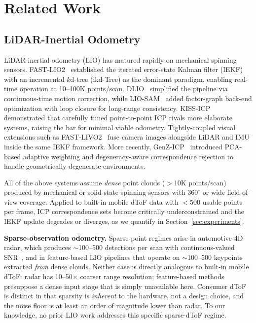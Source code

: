 \section{Related Work}
\label{sec:related}

\subsection{LiDAR-Inertial Odometry}

LiDAR-inertial odometry (LIO) has matured rapidly on mechanical spinning
sensors.  FAST-LIO2~\cite{xu2022fastlio2} established the iterated
error-state Kalman filter (IEKF) with an incremental $k$d-tree (ikd-Tree)
as the dominant paradigm, enabling real-time operation at 10--100K
points/scan.  DLIO~\cite{chen2023dlio} simplified the pipeline via
continuous-time motion correction, while LIO-SAM~\cite{shan2020liosam}
added factor-graph back-end optimization with loop closure for long-range
consistency.  KISS-ICP~\cite{vizzo2023kiss} demonstrated that
carefully tuned point-to-point ICP rivals more elaborate systems, raising
the bar for minimal viable odometry.  Tightly-coupled visual extensions
such as FAST-LIVO2~\cite{zheng2024fastlivo2} fuse camera images alongside
LiDAR and IMU inside the same IEKF framework.  More recently,
GenZ-ICP~\cite{lee2025genz} introduced PCA-based adaptive weighting and
degeneracy-aware correspondence rejection to handle geometrically
degenerate environments.

All of the above systems assume \emph{dense} point clouds ($>$10K
points/scan) produced by mechanical or solid-state spinning sensors with
$360^{\circ}$ or wide field-of-view coverage.  Applied to built-in mobile
dToF data with $<$500 usable points per frame, ICP correspondence sets
become critically underconstrained and the IEKF update degrades or
diverges, as we quantify in Section~\ref{sec:experiments}.

\textbf{Sparse-observation odometry.}  Sparse point regimes arise in
automotive 4D radar, which produces ${\sim}$100--500 detections per scan
with continuous-valued SNR~\cite{zhang2023radar}, and in feature-based LIO
pipelines that operate on ${\sim}$100--500 keypoints extracted \emph{from}
dense clouds.  Neither case is directly analogous to built-in mobile dToF:
radar has 10--50$\times$ coarser range resolution; feature-based methods
presuppose a dense input stage that is simply unavailable here.  Consumer
dToF is distinct in that sparsity is \emph{inherent} to the hardware, not a
design choice, and the noise floor is at least an order of magnitude lower
than radar.  To our knowledge, no prior LIO work addresses this specific
sparse-dToF regime.

